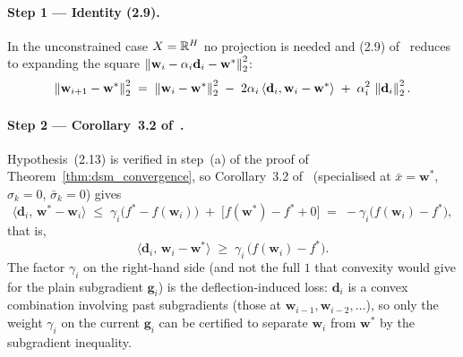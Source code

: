 \paragraph{Step 1 --- Identity (2.9).}
In the unconstrained case $X = \mathbb{R}^{H}$ no projection is needed and (2.9) of~\cite{dantonio2009deflected} reduces to expanding the square $\left\lVert \mathbf{w}_i - \alpha_i \mathbf{d}_i - \mathbf{w}^* \right\rVert_{2}^{2}$:
\begin{equation}\label{eq:app-prf-29}
\left\lVert \mathbf{w}_{i+1} - \mathbf{w}^* \right\rVert_{2}^{2} \;=\; \left\lVert \mathbf{w}_i - \mathbf{w}^* \right\rVert_{2}^{2} \;-\; 2\alpha_i\,\langle \mathbf{d}_i, \mathbf{w}_i - \mathbf{w}^* \rangle \;+\; \alpha_i^{2}\,\left\lVert \mathbf{d}_i \right\rVert_{2}^{2}.
\end{equation}

\paragraph{Step 2 --- Corollary~3.2 of~\cite{dantonio2009deflected}.}
Hypothesis~(2.13) is verified in step~(a) of the proof of Theorem~\ref{thm:dsm_convergence}, so Corollary~3.2 of~\cite{dantonio2009deflected} (specialised at $\bar x = \mathbf{w}^*$, $\sigma_k = 0$, $\bar\sigma_k = 0$) gives
\[
\langle \mathbf{d}_i,\, \mathbf{w}^* - \mathbf{w}_i \rangle \;\le\; \gamma_i\bigl(f^* - f(\mathbf{w}_i)\bigr) \;+\; \bigl[f(\mathbf{w}^*) - f^* + 0\bigr] \;=\; -\gamma_i\bigl(f(\mathbf{w}_i) - f^*\bigr),
\]
that is,
\begin{equation}\label{eq:app-prf-32}
\langle \mathbf{d}_i,\, \mathbf{w}_i - \mathbf{w}^* \rangle \;\ge\; \gamma_i\,\bigl(f(\mathbf{w}_i) - f^*\bigr).
\end{equation}
The factor $\gamma_i$ on the right-hand side (and not the full $1$ that convexity would give for the plain subgradient $\mathbf{g}_i$) is the deflection-induced loss: $\mathbf{d}_i$ is a convex combination involving past subgradients (those at $\mathbf{w}_{i-1}, \mathbf{w}_{i-2}, \dots$), so only the weight $\gamma_i$ on the current $\mathbf{g}_i$ can be certified to separate $\mathbf{w}_i$ from $\mathbf{w}^*$ by the subgradient inequality.

